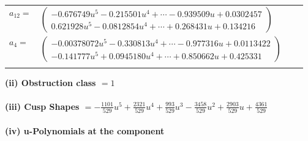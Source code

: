 \documentclass[1p]{elsarticle_modified}
\theoremstyle{definition}
\begin{document}
\begin{tabular}{m{7pt} m{180pt} m{7pt} m{180pt} }
\flushright $a_{12}=$&$\begin{pmatrix}-0.676749 u^{5}-0.215501 u^{4}+\cdots-0.939509 u+0.0302457\\0.621928 u^{5}-0.0812854 u^{4}+\cdots+0.268431 u+0.134216\end{pmatrix}$ \\
\flushright $a_{4}=$&$\begin{pmatrix}-0.00378072 u^{5}-0.330813 u^{4}+\cdots-0.977316 u+0.0113422\\-0.141777 u^{5}+0.0945180 u^{4}+\cdots+0.850662 u+0.425331\end{pmatrix}$\\&\end{tabular}
\flushleft \textbf{(ii) Obstruction class $= 1$}\\~\\
\flushleft \textbf{(iii) Cusp Shapes $= -\frac{1101}{529} u^5+\frac{2321}{529} u^4+\frac{993}{529} u^3-\frac{3458}{529} u^2+\frac{2903}{529} u+\frac{4361}{529}$}\\~\\
\newpage\renewcommand{\arraystretch}{1}
\flushleft \textbf{(iv) u-Polynomials at the component}\newline \\
\end{document}
